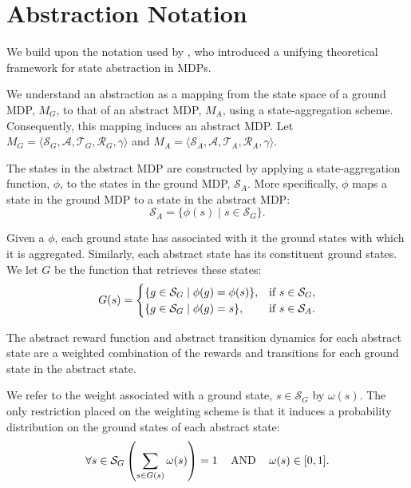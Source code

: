 \section{Abstraction Notation}
We build upon the notation used by \citet{li2006towards}, who introduced a unifying theoretical framework for state abstraction in \acp{MDP}.

We understand an abstraction as a mapping from the state space of a ground \ac{MDP}, $M_G$, to that of an abstract MDP, $M_A$, using a state-aggregation scheme. Consequently, this mapping induces an abstract \ac{MDP}. Let $M_G = \langle \mathcal{S}_G, \mathcal{A}, \mathcal{T}_G, \mathcal{R}_G, \gamma \rangle$ and $M_A = \langle \mathcal{S}_A, \mathcal{A}, \mathcal{T}_A, \mathcal{R}_A, \gamma \rangle$.
\edefn

The states in the abstract \ac{MDP} are constructed by applying a state-aggregation function, $\phi$, to the states in the ground \ac{MDP}, $\mathcal{S}_A$. More specifically, $\phi$ maps a state in the ground \ac{MDP} to a state in the abstract \ac{MDP}:
\begin{equation}
\mathcal{S}_A = \{ \phi(s) \mid s \in \mathcal{S}_G\}.
\end{equation}
\edefn


Given a $\phi$, each ground state has associated with it the ground states with which it is aggregated. Similarly, each abstract state has its constituent ground states. We let $G$ be the function that retrieves these states:
\begin{equation}
G(s)=
\begin{cases}
\{g \in \mathcal{S}_G \mid \phi(g) = \phi(s) \},& \text{if } s \in \mathcal{S}_G,\\
\{g \in \mathcal{S}_G \mid \phi(g)=s \},& \text{if } s \in \mathcal{S}_A.
\end{cases}
\end{equation}
\edefn

The abstract reward function and abstract transition dynamics for each abstract state are a weighted combination of the rewards and transitions for each ground state in the abstract state.


We refer to the weight associated with a ground state, $s \in \mathcal{S}_G$ by $\omega(s)$. The only restriction placed on the weighting scheme is that it induces a probability distribution on the ground states of each abstract state:
\begin{equation}
\forall s \in \mathcal{S}_G \left(\sum_{s \in G(s)} \omega(s)\right) = 1 \hspace{3mm} \textrm{ AND }\hspace{3mm}  \omega(s) \in [0,1].
\end{equation}
\edefn

